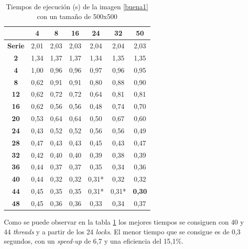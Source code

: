 \begin{table}[H]
	\centering
	\small
	\begin{tabular}{|c|c|c|c|c|c|c|}
		\hline
		{\bf \backslashbox{Threads}{Locks}}   & {\bf 4} & {\bf 8} & {\bf 16} & {\bf 24} & {\bf 32} & {\bf 50} \\ \hline
		{\bf Serie}  & 2,01    & 2,03    & 2,03     & 2,04     & 2,04     & 2,03     \\ \hline
		{\bf 2}  & 1,34    & 1,37    & 1,37     & 1,34     & 1,35     & 1,35     \\ \hline
		{\bf 4}  & 1,00    & 0,96    & 0,96     & 0,97     & 0,96     & 0,95     \\ \hline
		{\bf 8}  & 0,62    & 0,91    & 0,91     & 0,80     & 0,88     & 0,90     \\ \hline
		{\bf 12} & 0,62    & 0,72    & 0,72     & 0,64     & 0,81     & 0,81     \\ \hline
		{\bf 16} & 0,62    & 0,56    & 0,56     & 0,48     & 0,74     & 0,70     \\ \hline
		{\bf 20} & 0,53    & 0,64    & 0,64     & 0,50     & 0,67     & 0,60     \\ \hline
		{\bf 24} & 0,43    & 0,52    & 0,52     & 0,56     & 0,56     & 0,49     \\ \hline
		{\bf 28} & 0,47    & 0,43    & 0,43     & 0,45     & 0,43     & 0,47     \\ \hline
		{\bf 32} & 0,42    & 0,40    & 0,40     & 0,39     & 0,38     & 0,39     \\ \hline
		{\bf 36} & 0,44    & 0,37    & 0,37     & 0,35     & 0,34     & 0,36     \\ \hline
		{\bf 40} & 0,44    & 0,32    & 0,32     & 0,31*     & 0,32     & 0,32     \\ \hline
		{\bf 44} & 0,45    & 0,35    & 0,35     & 0,31*     & 0,31*     & \textbf{0,30}     \\ \hline
		{\bf 48} & 0,45    & 0,36    & 0,36     & 0,33     & 0,34     & 0,37     \\ \hline
	\end{tabular}
	\captionsetup{justification=centering}	
	\caption{Tiempos de ejecuci\'{o}n (s) de la imagen \ref{buena1} con un tama\~{n}o de 500x500}
	\label{img1-500}	
\end{table}

Como se puede observar en la tabla \ref{img1-500} los mejores tiempos se consiguen con 40 y 44 \textit{threads} y a partir de los 24 \textit{locks}. El menor tiempo que se consigue es de 0,3 segundos, con un \textit{speed-up} de 6,7 y una eficiencia del 15,1\%.

